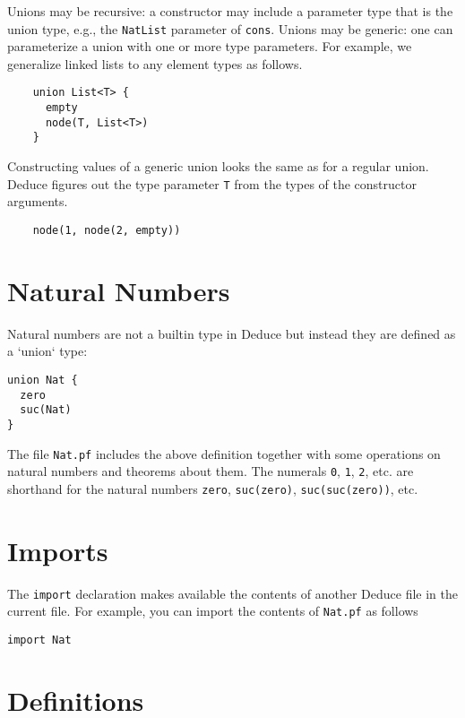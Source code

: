 \documentclass[12pt]{article}
\begin{document}
Unions may be recursive: a constructor may include a parameter type
that is the union type, e.g., the \texttt{NatList} parameter of
\texttt{cons}. Unions may be generic: one can parameterize a union
with one or more type parameters. For example, we generalize linked
lists to any element types as follows.

\begin{verbatim}
    union List<T> {
      empty
      node(T, List<T>)
    }
\end{verbatim}

Constructing values of a generic union looks the same as for a regular
union. Deduce figures out the type parameter \texttt{T} from the types
of the constructor arguments.

\begin{verbatim}
    node(1, node(2, empty))
\end{verbatim}

\section{Natural Numbers}

Natural numbers are not a builtin type in Deduce but instead they
are defined as a `union` type:

\begin{verbatim}
union Nat {
  zero
  suc(Nat)
}
\end{verbatim}

The file \texttt{Nat.pf} includes the above definition together with some
operations on natural numbers and theorems about them.  The numerals
\texttt{0}, \texttt{1}, \texttt{2}, etc. are shorthand for the natural numbers \texttt{zero},
\texttt{suc(zero)}, \texttt{suc(suc(zero))}, etc.

\section{Imports}

The \texttt{import} declaration makes available the contents of another
Deduce file in the current file. For example, you can import the
contents of \texttt{Nat.pf} as follows

\begin{verbatim}
import Nat
\end{verbatim}

\section{Definitions}
\end{document}
